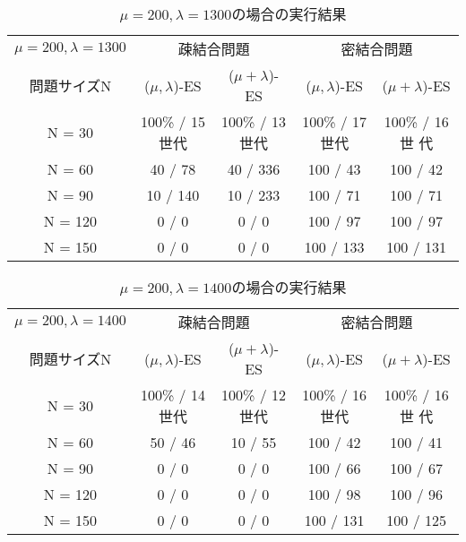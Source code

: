 \documentclass[a4j]{jarticle}
\begin{document}
\begin{table}[htb]
 \begin{center}
  \begin{tabular}[tb]{|c||c|c||c|c|} \hline
   $\mu = 200, \lambda = 1300$& \multicolumn{2}{c||}{疎結合問題} &
   \multicolumn{2}{c|}{密結合問題} \\ \cline{2-5}
   問題サイズN& ($\mu, \lambda$)-ES& ($\mu + \lambda$)-ES& ($\mu, \lambda$)-ES&
   ($\mu + \lambda$)-ES \\ \hline \hline
   N = 30& 100\% / 15世代& 100\% / 13世代&100\% / 17世代 & 100\% / 16世
   代\\ \hline
   N = 60& 40 / 78& 40 / 336& 100 / 43& 100 / 42\\ \hline
   N = 90& 10 / 140& 10 / 233& 100 / 71& 100 / 71\\ \hline
   N = 120& 0 / 0& 0 / 0& 100 / 97& 100 / 97\\ \hline
   N = 150& 0 / 0& 0 / 0& 100 / 133& 100 / 131\\ \hline
  \end{tabular}
  \caption{$\mu = 200, \lambda = 1300$の場合の実行結果}
  \label{213}
 \end{center}
\end{table}

\clearpage
\begin{table}[htb]
 \begin{center}
  \begin{tabular}[tb]{|c||c|c||c|c|} \hline
   $\mu = 200, \lambda = 1400$& \multicolumn{2}{c||}{疎結合問題} &
   \multicolumn{2}{c|}{密結合問題} \\ \cline{2-5}
   問題サイズN& ($\mu, \lambda$)-ES& ($\mu + \lambda$)-ES& ($\mu, \lambda$)-ES&
   ($\mu + \lambda$)-ES \\ \hline \hline
   N = 30& 100\% / 14世代& 100\% / 12世代& 100\% / 16世代& 100\% / 16世
   代\\ \hline
   N = 60& 50 / 46& 10 / 55& 100 / 42 &100 / 41 \\ \hline
   N = 90& 0 / 0& 0 / 0& 100 / 66& 100 / 67\\ \hline
   N = 120& 0 / 0& 0 / 0& 100 / 98& 100 / 96\\ \hline
   N = 150& 0 / 0& 0 / 0& 100 / 131& 100 / 125\\ \hline
  \end{tabular}
  \caption{$\mu = 200, \lambda = 1400$の場合の実行結果}
  \label{214}
 \end{center}
\end{table}
\end{document}
